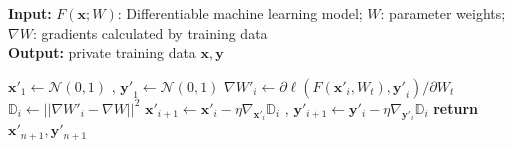 \begin{algorithm}[t]
    \caption{Deep Leakage from Gradients.}\label{algorithm:deep_leakage}
    
    \hspace*{\algorithmicindent} \textbf{Input:} 
        $F(\mathbf{x};W)$: Differentiable machine learning model;
        $W$: parameter weights; $\nabla W$: gradients calculated by training data
    \\
    \hspace*{\algorithmicindent} \textbf{Output:} private training data $\mathbf{x}, \mathbf{y}$ 
    \begin{algorithmic}[1]
        \State $\mathbf{x'}_{1} \gets \mathcal{N}(0, 1)$ 
               , $\mathbf{y'}_{1} \gets \mathcal{N}(0, 1)$ 
                \State $
                    \nabla W'_i \gets 
                        \partial \ell (F(\mathbf{x'}_i, W_{t}), \mathbf{y'}_i)
                        /
                        \partial W_t
                    $  
                \State 
                    $ \mathbb{D}_i \gets ||\nabla W'_i - \nabla W||^2 $ 
                \State 
                    $\mathbf{x}'_{i+1} \gets \mathbf{x}'_i - \eta \nabla_{\mathbf{x}'_i} \mathbb{D}_i$
                   ,
                    $\mathbf{y}'_{i+1} \gets \mathbf{y}'_i - \eta \nabla_{\mathbf{y}'_i} \mathbb{D}_i$
        \EndFor
        \State \textbf{return} $\mathbf{x}'_{n+1}, \mathbf{y}'_{n+1}$
    \EndProcedure
    \end{algorithmic}
\end{algorithm}